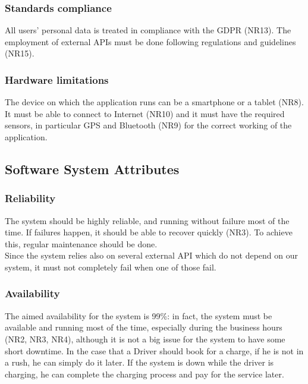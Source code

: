 \documentclass[../main.tex]{subfiles}
\begin{document}
\subsubsection{Standards compliance}
All users' personal data is treated in compliance with the GDPR (NR13). The employment of external APIs must be done following regulations and guidelines (NR15).

\subsubsection{Hardware limitations}
The device on which the application runs can be a smartphone or a tablet (NR8). It must be able to connect to Internet (NR10) and it must have the required sensors, in particular GPS and Bluetooth (NR9) for the correct working of the application. 



\subsection{Software System Attributes}

\subsubsection{Reliability}
The system should be highly reliable, and running without failure most of the time. If failures happen, it should be able to recover quickly (NR3). To achieve this, regular maintenance should be done.
\\
Since the system relies also on several external API which do not depend on our system, it must not completely fail when one of those fail. 

\subsubsection{Availability}
The aimed availability for the system is 99\%: in fact, the system must be available and running most of the time, especially during the business hours (NR2, NR3, NR4), although it is not a big issue for the system to have some short downtime. In the case that a Driver should book for a charge, if he is not in a rush, he can simply do it later. If the system is down while the driver is charging, he can complete the charging process and pay for the service later. 
\end{document}
